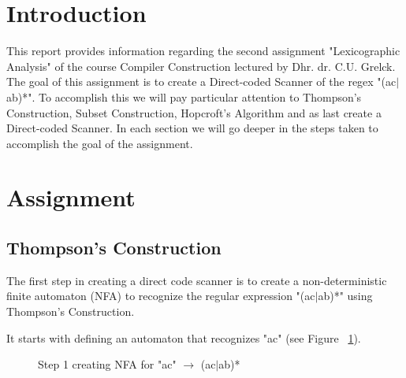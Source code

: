 \documentclass[hidelinks]{uva-inf-article}
\begin{document}
\section{Introduction}
\begin{flushleft}
\par This report provides information regarding the second assignment 
     "Lexicographic Analysis" of the course Compiler Construction lectured by Dhr. dr. C.U. Grelck. 
     The goal of this assignment is to create a Direct-coded Scanner of the regex "(ac$\mid$ab)*". To accomplish this we will pay particular attention to 
     Thompson’s Construction, Subset Construction, Hopcroft’s Algorithm and as last create a Direct-coded Scanner. In each section we will go deeper 
     in the steps taken to accomplish the goal of the assignment.


\newpage
\section{Assignment}

\subsection{Thompson’s Construction}

    \par The first step in creating a direct code scanner is to create a 
         non-deterministic finite automaton (NFA) to recognize the regular expression
         "(ac$\mid$ab)*" using Thompson's Construction.

    \par It starts with defining an automaton that recognizes "ac" (see Figure ~\ref{fig:ThCoStep1}).

    \begin{figure}[h]
        \centering
        \caption{Step 1 creating NFA for "ac" $\rightarrow$ (ac$\mid$ab)*}
        \label{fig:ThCoStep1}
    \end{figure}


\end{flushleft}
\end{document}
